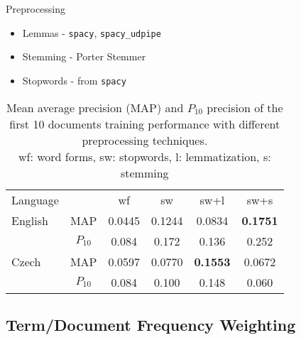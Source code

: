 \documentclass{beamer}
\begin{document}
\begin{frame}{Preprocessing}
\begin{itemize}
  \item Lemmas - \texttt{spacy}, \texttt{spacy\_udpipe}
  \item Stemming - Porter Stemmer
  \item Stopwords - from \texttt{spacy}
\end{itemize}

\begin{table}[htpb]
	\centering
	\caption{Mean average precision (MAP) and $P_{10}$ precision of the first 10
		documents training performance with different preprocessing techniques.\\
	wf: word forms, sw: stopwords, l: lemmatization, s: stemming\\}
	\label{tab:terms}
	\begin{tabular}{@{}l|ccccc@{}}
		\toprule
		Language & & wf & sw & sw+l & sw+s \\
		\cmidrule(r){1-1}\cmidrule(lr){2-2}\cmidrule(lr){3-3}\cmidrule(lr){4-4}\cmidrule(lr){5-5}\cmidrule(l){6-6}
		English & MAP & 0.0445 & 0.1244 & 0.0834 & \textbf{0.1751} \\
				& \small{$P_{10}$} & \small{0.084} & \small{0.172} & \small{0.136} & \small{0.252} \\
		\cmidrule(r){1-1}\cmidrule(lr){2-2}\cmidrule(lr){3-3}\cmidrule(lr){4-4}\cmidrule(lr){5-5}\cmidrule(l){6-6}
		Czech & MAP & 0.0597 & 0.0770 & \textbf{0.1553} & 0.0672 \\
			  & \small{$P_{10}$} & \small{0.084} & \small{0.100} & \small{0.148} & \small{0.060} \\
		\bottomrule
	\end{tabular}
\end{table}

\end{frame}

\subsection{Term/Document Frequency Weighting}
\end{document}
